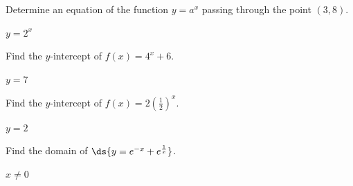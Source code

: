 \begin{enumialphparenastyle}

\begin{ex}
Determine an equation of the function $y=a^x$ passing through the point $(3,8)$.
\begin{sol}
$y=2^x$
\end{sol}
\end{ex}

\begin{ex}
Find the $y$-intercept of $f(x)=4^x+6$.
\begin{sol}
$y=7$
\end{sol}
\end{ex}

\begin{ex}
Find the $y$-intercept of $f(x)=2\left(\frac{1}{2}\right)^x$.
\begin{sol}
$y=2$
\end{sol}
\end{ex}

\begin{ex}
Find the domain of $\ds{y=e^{-x}+e^{\frac{1}{x}}}$.
\begin{sol}
$x\neq 0$
\end{sol}
\end{ex}

\end{enumialphparenastyle}